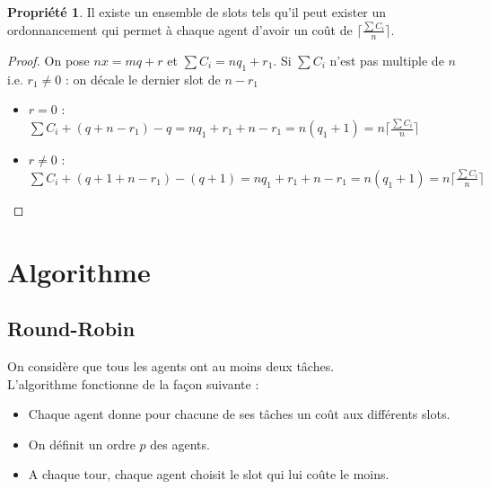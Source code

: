 \documentclass[12pt]{article}
\theoremstyle{definition}
\newtheorem{prop}{Propriété}
\begin{document}
\begin{prop}
Il existe un ensemble de slots tels qu'il peut exister un ordonnancement qui permet à chaque agent d'avoir un coût de $\lceil\frac{\sum C_i}{n}\rceil$.
\end{prop}
\begin{proof}
On pose $nx = mq+r$ et $\sum C_i = nq_1+r_1$. Si $\sum C_i$ n'est pas multiple de $n$ i.e. $r_1 \neq 0$ : on décale le dernier slot de $n-r_1$\\
\begin{itemize}
\item $r = 0$ : $\sum C_i + (q+n-r_1)-q = nq_1 + r_1 + n - r_1 = n(q_1 + 1) = n\lceil\frac{\sum C_i}{n}\rceil$
\item $r \neq 0$ : $\sum C_i + (q+1+n-r_1)-(q+1) = nq_1 + r_1 + n - r_1 = n(q_1 + 1) = n\lceil\frac{\sum C_i}{n}\rceil$
\end{itemize}
\end{proof}

\section{Algorithme}
\subsection{Round-Robin}
\noindent
On considère que tous les agents ont au moins deux tâches.\\
L'algorithme fonctionne de la façon suivante :
\begin{itemize}
	\item Chaque agent donne pour chacune de ses tâches un coût aux différents slots.
	\item On définit un ordre $p$ des agents.
	\item A chaque tour, chaque agent choisit le slot qui lui coûte le moins.
\end{itemize}
\end{document}
